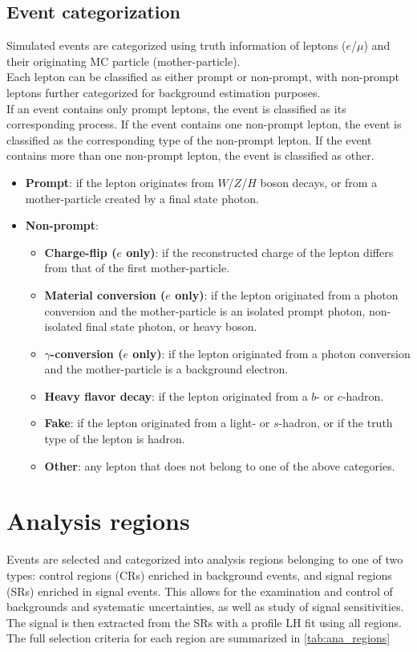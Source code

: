 \documentclass[../thesis.tex]{subfiles}
\begin{document}
\subsection*{Event categorization}
Simulated events are categorized using truth information of leptons ($e$/$\mu$) and their originating MC particle (mother-particle).\\
Each lepton can be classified as either prompt or non-prompt, with non-prompt leptons further categorized for background estimation purposes.\\
If an event contains only prompt leptons, the event is classified as its corresponding process. If the event contains one non-prompt lepton, the event is classified as the corresponding type of the non-prompt lepton. If the event contains more than one non-prompt lepton, the event is classified as other.
\begin{itemize}
\item \textbf{Prompt}: if the lepton originates from $W$/$Z$/$H$ boson decays, or from a mother-particle created by a final state photon.
\item \textbf{Non-prompt}:
	\begin{itemize}
	\item \textbf{Charge-flip ($e$ only)}: if the reconstructed charge of the lepton differs from that of the first mother-particle.
	\item \textbf{Material conversion ($e$ only)}: if the lepton originated from a photon conversion and the mother-particle is an isolated prompt photon, non-isolated final state photon, or heavy boson.
	\item \textbf{$\gamma$-conversion ($e$ only)}: if the lepton originated from a photon conversion and the mother-particle is a background electron.
	\item \textbf{Heavy flavor decay}: if the lepton originated from a $b$- or $c$-hadron.
	\item \textbf{Fake}: if the lepton originated from a light- or $s$-hadron, or if the truth type of the lepton is hadron.
	\item \textbf{Other}: any lepton that does not belong to one of the above categories.
	\end{itemize}
\end{itemize}

\section{Analysis regions}
\label{sec:ana}
Events are selected and categorized into analysis regions belonging to one of two types: control regions (CRs) enriched in background events, and signal regions (SRs) enriched in signal events. This allows for the examination and control of backgrounds and systematic uncertainties, as well as study of signal sensitivities.\\
The signal is then extracted from the SRs with a profile LH fit using all regions.
The full selection criteria for each region are summarized in \autoref{tab:ana_regions}
\end{document}
